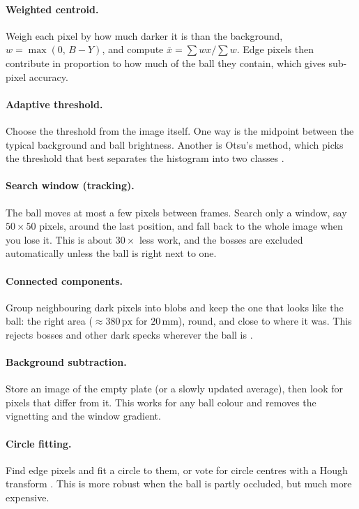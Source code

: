 \documentclass[10pt,a4paper]{article}
\newcommand{\un}[1]{\,\mathrm{#1}}
\begin{document}
\paragraph{Weighted centroid.} Weigh each pixel by how much darker it is than the background,
$w=\max(0,\,B-Y)$, and compute $\bar x=\sum wx/\sum w$. Edge pixels then contribute in proportion
to how much of the ball they contain, which gives sub-pixel accuracy.

\paragraph{Adaptive threshold.} Choose the threshold from the image itself. One way is the
midpoint between the typical background and ball brightness. Another is Otsu's method, which
picks the threshold that best separates the histogram into two classes \citep{otsu1979threshold}.

\paragraph{Search window (tracking).} The ball moves at most a few pixels between frames. Search
only a window, say $50\times50$ pixels, around the last position, and fall back to the whole
image when you lose it. This is about $30\times$ less work, and the bosses are excluded
automatically unless the ball is right next to one.

\paragraph{Connected components.} Group neighbouring dark pixels into blobs and keep the one that
looks like the ball: the right area ($\approx380\un{px}$ for $20\un{mm}$), round, and close to
where it was. This rejects bosses and other dark specks wherever the ball is
\citep{gonzalez2018digital}.

\paragraph{Background subtraction.} Store an image of the empty plate (or a slowly updated
average), then look for pixels that differ from it. This works for any ball colour and removes
the vignetting and the window gradient.

\paragraph{Circle fitting.} Find edge pixels and fit a circle to them, or vote for circle centres
with a Hough transform \citep{duda1972use}. This is more robust when the ball is partly
occluded, but much more expensive.
\end{document}
